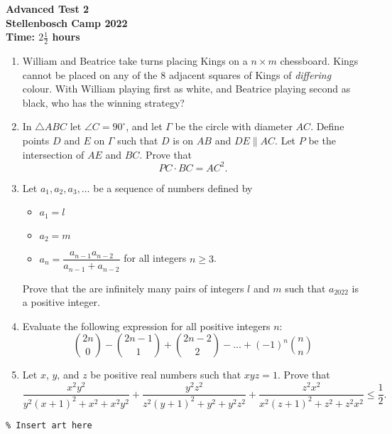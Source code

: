 \documentclass{article}
\begin{document}
\thispagestyle{empty}

\begin{center}
  \textbf{\Large Advanced Test 2}
  \\ \vspace{1em}
  \textbf{\large Stellenbosch Camp 2022}
  \\ \vspace{1em}
  \textbf{\large Time: $2\frac{1}{2}$ hours}
\end{center}

\bigskip

\vfill

\begin{enumerate}[itemsep=\fill]

\item %
William and Beatrice take turns placing Kings on a $n \times m$ chessboard.
Kings cannot be placed on any of the 8 adjacent squares of Kings of \emph{differing} colour.
With William playing first as white, and Beatrice playing second as black, who has the winning strategy?


\item %
In $\triangle ABC$ let $\angle C = 90^\circ$, and let $\Gamma$ be the circle with diameter $AC$.
Define points $D$ and $E$ on $\Gamma$ such that $D$ is on $AB$ and $DE \parallel AC$.
Let $P$ be the intersection of $AE$ and $BC$.
Prove that
\[ PC \cdot BC = AC^2. \]

\vspace{0pt}


\item %
Let $a_1, a_2, a_3, \dots$ be a sequence of numbers defined by 
\begin{itemize}
	\item $a_1 = l$
	\item $a_2 = m$
	\item $a_n = \dfrac{a_{n-1}a_{n-2}}{a_{n-1}+a_{n-2}}$ for all integers $n \geq 3$.
\end{itemize}
Prove that the are infinitely many pairs of integers $l$ and $m$ such that $a_{2022}$ is a positive integer.


\item %
Evaluate the following expression for all positive integers $n$:
\[ {2n \choose 0} -{2n-1 \choose 1}+{2n-2 \choose 2}-...+(-1)^n{n \choose n} \]

\vspace{0pt}


\item %
Let $x$, $y$, and $z$ be positive real numbers such that $xyz = 1$.
Prove that
\[ \frac{x^2y^2}{y^2(x+1)^2+x^2+x^2y^2} +\frac{y^2z^2}{z^2(y+1)^2+y^2+y^2z^2} +\frac{z^2x^2}{x^2(z+1)^2+z^2+z^2x^2} \leq \frac{1}{2}. \]

\end{enumerate}


\vfill
\centering
\small
\begin{BVerbatim}
\end{BVerbatim}
\end{document}

